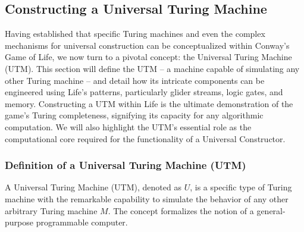 \documentclass{article}
\theoremstyle{definition}
\theoremstyle{plain}
\theoremstyle{plain}
\begin{document}
\subsection{Constructing a Universal Turing Machine}

Having established that specific Turing machines and even the complex mechanisms for universal construction can be conceptualized within Conway's Game of Life, we now turn to a pivotal concept: the Universal Turing Machine (UTM). This section will define the UTM – a machine capable of simulating any other Turing machine – and detail how its intricate components can be engineered using Life's patterns, particularly glider streams, logic gates, and memory. Constructing a UTM within Life is the ultimate demonstration of the game's Turing completeness, signifying its capacity for any algorithmic computation. We will also highlight the UTM's essential role as the computational core required for the functionality of a Universal Constructor.

\subsubsection{Definition of a Universal Turing Machine (UTM)}
A Universal Turing Machine (UTM), denoted as $U$, is a specific type of Turing machine with the remarkable capability to simulate the behavior of any other arbitrary Turing machine $M$. The concept formalizes the notion of a general-purpose programmable computer.
\end{document}
